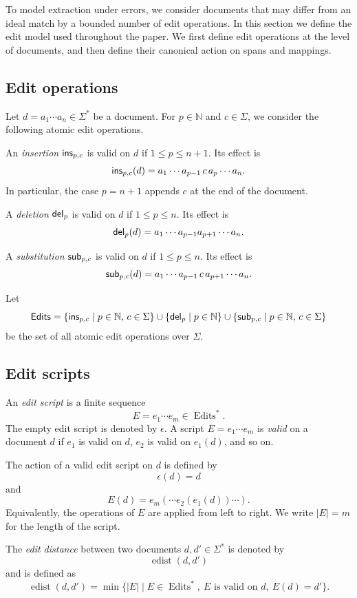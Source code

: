 
To model extraction under errors, we consider documents that may differ from an ideal match by a bounded number of edit operations. In this section we define the edit model used throughout the paper. We first define edit operations at the level of documents, and then define their canonical action on spans and mappings.

\subsection{Edit operations}

Let $d=a_1\cdots a_n\in\Sigma^*$ be a document. For $p\in\mathbb{N}$ and $c\in\Sigma$, we consider the following atomic edit operations.

An \emph{insertion} $\mathsf{ins}_{p,c}$ is valid on $d$ if $1\leq p\leq n+1$. Its effect is
\[
\mathsf{ins}_{p,c}(d)
=
a_1\cdots a_{p-1}\,c\,a_p\cdots a_n.
\]
In particular, the case $p=n+1$ appends $c$ at the end of the document.

A \emph{deletion} $\mathsf{del}_p$ is valid on $d$ if $1\leq p\leq n$. Its effect is
\[
\mathsf{del}_p(d)
=
a_1\cdots a_{p-1}a_{p+1}\cdots a_n.
\]

A \emph{substitution} $\mathsf{sub}_{p,c}$ is valid on $d$ if $1\leq p\leq n$. Its effect is
\[
\mathsf{sub}_{p,c}(d)
=
a_1\cdots a_{p-1}\,c\,a_{p+1}\cdots a_n.
\]


Let
\[
\mathsf{Edits}
=
\{\mathsf{ins}_{p,c}\mid p\in\mathbb{N},\,c\in\Sigma\}
\cup
\{\mathsf{del}_p\mid p\in\mathbb{N}\}
\cup
\{\mathsf{sub}_{p,c}\mid p\in\mathbb{N},\,c\in\Sigma\}
\]
be the set of all atomic edit operations over $\Sigma$.

\subsection{Edit scripts}

An \emph{edit script} is a finite sequence
\[
E=e_1\cdots e_m\in\operatorname{Edits}^*.
\]
The empty edit script is denoted by $\epsilon$. A script $E=e_1\cdots e_m$ is \emph{valid} on a document $d$ if $e_1$ is valid on $d$, $e_2$ is valid on $e_1(d)$, and so on.

The action of a valid edit script on $d$ is defined by
\[
\epsilon(d)=d
\]
and
\[
E(d)=e_m(\cdots e_2(e_1(d))\cdots).
\]
Equivalently, the operations of $E$ are applied from left to right. We write $|E|=m$ for the length of the script.

The \emph{edit distance} between two documents $d,d'\in\Sigma^*$ is denoted by
\[
\operatorname{edist}(d,d')
\]
and is defined as
\[
\operatorname{edist}(d,d')
=
\min
\{
|E|
\mid
E\in\operatorname{Edits}^*,
\ E \text{ is valid on } d,
\ E(d)=d'
\}.
\]

